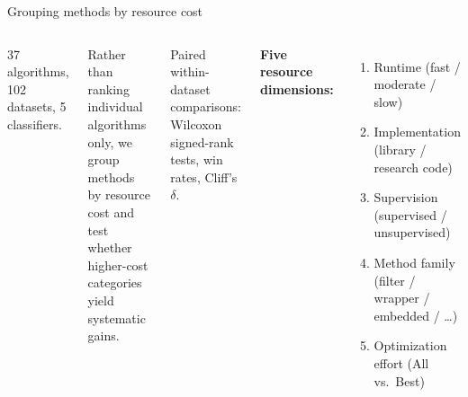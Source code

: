 \documentclass[aspectratio=169,10pt,dvipsnames]{beamer}
\begin{document}
\begin{frame}{Grouping methods by resource cost}
\begin{columns}[T]
\vspace{0.2cm}
37 algorithms, 102 datasets, 5 classifiers.

\medskip
Rather than ranking individual algorithms only, we group methods by resource cost
and test whether higher-cost categories yield systematic gains.

\medskip
Paired within-dataset comparisons:
Wilcoxon signed-rank tests, win rates, Cliff's $\delta$.

\pause
{}
\vspace{0.2cm}
\textbf{Five resource dimensions:}
\begin{enumerate}
  \item Runtime (fast / moderate / slow)
  \item Implementation (library / research code)
  \item Supervision (supervised / unsupervised)
  \item Method family (filter / wrapper / embedded / \ldots)
  \item Optimization effort (All vs.\ Best)
\end{enumerate}
\end{columns}
\end{frame}
\end{document}
